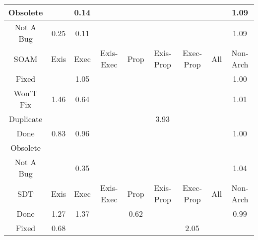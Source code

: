 \begin{tabular}{|c||c|c|c|c|c|c|c|c|}
\hline
Obsolete &  & \cellcolor[rgb]{0.7650307914797384,0.1538124130040949,0.2846954053810892} 0.14 &  &  &  &  &  & \cellcolor[rgb]{0.9095609349370687,0.8397920218122956,0.42} 1.09 \\ 
\hline
Not A Bug & \cellcolor[rgb]{0.7828853368033399,0.23832392753580867,0.3013596476831172} 0.25 & \cellcolor[rgb]{0.76,0.13,0.28} 0.11 &  &  &  &  &  & \cellcolor[rgb]{0.9095405800573361,0.8397823800271592,0.42} 1.09 \\ 
\hline
\hline
SOAM & Exis & Exec & Exis-Exec & Prop & Exis-Prop & Exec-Prop & All & Non-Arch \\ 
\hline
Fixed &  & \cellcolor[rgb]{0.909754048484559,0.8398834966505805,0.42} 1.05 &  &  &  &  &  & \cellcolor[rgb]{0.909498212371905,0.8376248718936834,0.41953166488044463} 1.00 \\ 
\hline
Won'T Fix & \cellcolor[rgb]{0.9077090784384332,0.8389148266287314,0.42} 1.46 & \cellcolor[rgb]{0.8497451770845972,0.5547938382004267,0.3637621652789574} 0.64 &  &  &  &  &  & \cellcolor[rgb]{0.9099364988685981,0.8399699205167043,0.42} 1.01 \\ 
\hline
Duplicate &  &  &  &  & \cellcolor[rgb]{0.8953416215570995,0.8330565575796786,0.42} 3.93 &  &  &  \\ 
\hline
Done & \cellcolor[rgb]{0.8811109715117911,0.7032585984891448,0.39303690674433844} 0.83 & \cellcolor[rgb]{0.9033048450595067,0.8083095999483312,0.4137511887222062} 0.96 &  &  &  &  &  & \cellcolor[rgb]{0.9099811648747758,0.839991078098578,0.42} 1.00 \\ 
\hline
Obsolete &  &  &  &  &  &  &  &  \\ 
\hline
Not A Bug &  & \cellcolor[rgb]{0.7993462303347151,0.31623882358431765,0.31672314831240067} 0.35 &  &  &  &  &  & \cellcolor[rgb]{0.9098063363845323,0.8399082646031996,0.42} 1.04 \\ 
\hline
\hline
SDT & Exis & Exec & Exis-Exec & Prop & Exis-Prop & Exec-Prop & All & Non-Arch \\ 
\hline
Done & \cellcolor[rgb]{0.9086514408605237,0.8393612088286692,0.42} 1.27 & \cellcolor[rgb]{0.9081619787685988,0.8391293583640731,0.42} 1.37 &  & \cellcolor[rgb]{0.8454000751446871,0.5342270223515189,0.35970673680170795} 0.62 &  &  &  & \cellcolor[rgb]{0.9077671845097688,0.829431340012905,0.41791603887578405} 0.99 \\ 
\hline
Fixed & \cellcolor[rgb]{0.855857022730868,0.5837232409261081,0.36946655454881006} 0.68 &  &  &  &  & \cellcolor[rgb]{0.9047599292920275,0.8375178612435918,0.42} 2.05 &  &  \\ 

\end{tabular}

